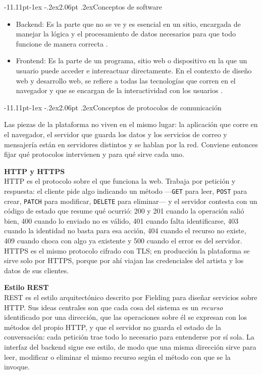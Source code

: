 \documentclass[12pt,letterpaper,oneside]{report}
\makeatletter
\renewcommand\subsection{\@startsection{subsection}{2}{\z@}%
  {-11.11pt\@plus -1ex \@minus -.2ex}{2.06pt \@plus .2ex}{\normalfont\normalsize\bfseries}}
\newcommand{\tituloparpegado}[1]{\par\textbf{#1}\\\indent\ignorespaces}
\makeatother
\begin{document}
\subsection{Conceptos de software }

\begin{itemize}
  \item Backend: Es la parte que no se ve y es esencial en un sitio, encargada de manejar la lógica y el procesamiento de datos necesarios para que todo funcione de manera correcta \cite{canaday1974}.

  \item Frontend: Es la parte de un programa, sitio web o dispositivo en la que un usuario puede acceder e intereactuar directamente. En el contexto de diseño web y desarrollo web, se refiere a todas las tecnologías que corren en el navegador y que se encargan de la interactividad con los usuarios \cite{perez2021}.
\end{itemize}

\subsection{Conceptos de protocolos de comunicación}

Las piezas de la plataforma no viven en el mismo lugar: la aplicación que corre en el navegador, el servidor que guarda los datos y los servicios de correo y mensajería están en servidores distintos y se hablan por la red. Conviene entonces fijar qué protocolos intervienen y para qué sirve cada uno.

\tituloparpegado{HTTP y HTTPS}
HTTP es el protocolo sobre el que funciona la web. Trabaja por petición y respuesta: el cliente pide algo indicando un método —\texttt{GET} para leer, \texttt{POST} para crear, \texttt{PATCH} para modificar, \texttt{DELETE} para eliminar— y el servidor contesta con un código de estado que resume qué ocurrió: 200 y 201 cuando la operación salió bien, 400 cuando lo enviado no es válido, 401 cuando falta identificarse, 403 cuando la identidad no basta para esa acción, 404 cuando el recurso no existe, 409 cuando choca con algo ya existente y 500 cuando el error es del servidor. HTTPS es el mismo protocolo cifrado con TLS; en producción la plataforma se sirve solo por HTTPS, porque por ahí viajan las credenciales del artista y los datos de sus clientes.

\tituloparpegado{Estilo REST}
REST es el estilo arquitectónico descrito por Fielding\cite{fielding2000} para diseñar servicios sobre HTTP. Sus ideas centrales son que cada cosa del sistema es un \textit{recurso} identificado por una dirección, que las operaciones sobre él se expresan con los métodos del propio HTTP, y que el servidor no guarda el estado de la conversación: cada petición trae todo lo necesario para entenderse por sí sola. La interfaz del backend sigue ese estilo, de modo que una misma dirección sirve para leer, modificar o eliminar el mismo recurso según el método con que se la invoque.
\end{document}
